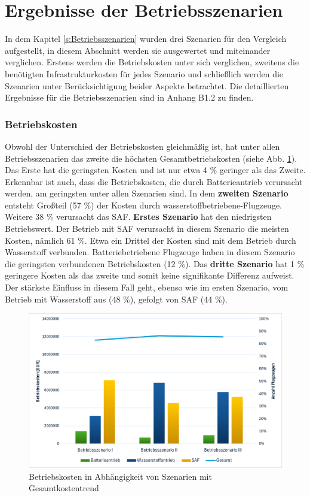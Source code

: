 \section{Ergebnisse der Betriebsszenarien}
In dem Kapitel \ref{s:Betriebsszenarien} wurden drei Szenarien für den Vergleich aufgestellt, 
in diesem Abschnitt werden sie ausgewertet und miteinander verglichen. 
Erstens werden die Betriebskosten unter sich verglichen, 
zweitens die benötigten Infrastrukturkosten für jedes Szenario und schließlich 
werden die Szenarien unter Berücksichtigung beider Aspekte betrachtet. 
Die detaillierten Ergebnisse für die Betriebsszenarien sind in Anhang B1.2 zu finden.
%
\subsubsection{Betriebskosten}
Obwohl der Unterschied der Betriebskosten gleichmäßig ist, 
hat unter allen Betriebsszenarien das zweite die höchsten Gesamtbetriebskosten (siehe Abb. \ref{res_betriebsszenarien}). 
Das Erste hat die geringsten Kosten und ist nur etwa 4 \% geringer als das Zweite.
Erkennbar ist auch, dass die Betriebskosten, die durch Batterieantrieb verursacht werden, 
am geringsten unter allen Szenarien sind.
In dem \textbf{zweiten Szenario} entsteht Großteil (57 \%) der Kosten durch wasserstoffbetriebene-Flugzeuge. 
Weitere 38 \% verursacht das SAF.
\textbf{Erstes Szenario} hat den niedrigsten Betriebswert. 
Der Betrieb mit SAF verursacht in diesem Szenario die meisten Kosten, nämlich 61 \%.
Etwa ein Drittel der Kosten sind mit dem Betrieb durch Wasserstoff verbunden. Batteriebetriebene 
Flugzeuge haben in diesem Szenario die geringsten verbundenen Betriebskosten (12 \%).
Das \textbf{dritte Szenario} hat 1 \% geringere Kosten als das zweite und somit 
keine signifikante Differenz aufweist. 
Der stärkste Einfluss in diesem Fall geht, ebenso wie im ersten Szenario, 
vom Betrieb mit Wasserstoff aus (48 \%), gefolgt von SAF (44 \%).

\begin{figure}[h]
	\centering
	\includegraphics[width=0.8\linewidth]{Bilder/betriebssz_res.png}
	\caption[Betriebskosten in Abhängigkeit von Szenarien mit Gesamtkostentrend]{Betriebskosten in Abhängigkeit von Szenarien mit Gesamtkostentrend}
	\label{res_betriebsszenarien}
\end{figure}

